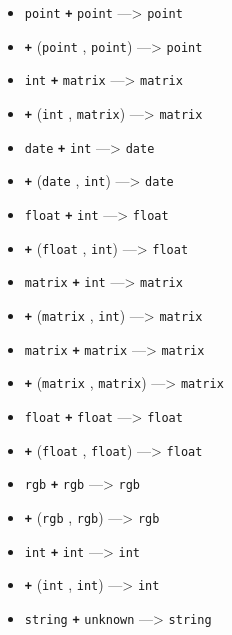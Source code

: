 \documentclass[]{book}
\providecommand{\tightlist}{%
  \setlength{\itemsep}{0pt}\setlength{\parskip}{0pt}}
\theoremstyle{definition}
\theoremstyle{definition}
\theoremstyle{definition}
\theoremstyle{remark}
\begin{document}
\begin{itemize}
\tightlist
\item
  \texttt{point} \textbf{\texttt{+}} \texttt{point} ---\textgreater{}
  \texttt{point}
\item
  \textbf{\texttt{+}} (\texttt{point} , \texttt{point})
  ---\textgreater{} \texttt{point}
\item
  \texttt{int} \textbf{\texttt{+}} \texttt{matrix} ---\textgreater{}
  \texttt{matrix}
\item
  \textbf{\texttt{+}} (\texttt{int} , \texttt{matrix}) ---\textgreater{}
  \texttt{matrix}
\item
  \texttt{date} \textbf{\texttt{+}} \texttt{int} ---\textgreater{}
  \texttt{date}
\item
  \textbf{\texttt{+}} (\texttt{date} , \texttt{int}) ---\textgreater{}
  \texttt{date}
\item
  \texttt{float} \textbf{\texttt{+}} \texttt{int} ---\textgreater{}
  \texttt{float}
\item
  \textbf{\texttt{+}} (\texttt{float} , \texttt{int}) ---\textgreater{}
  \texttt{float}
\item
  \texttt{matrix} \textbf{\texttt{+}} \texttt{int} ---\textgreater{}
  \texttt{matrix}
\item
  \textbf{\texttt{+}} (\texttt{matrix} , \texttt{int}) ---\textgreater{}
  \texttt{matrix}
\item
  \texttt{matrix} \textbf{\texttt{+}} \texttt{matrix} ---\textgreater{}
  \texttt{matrix}
\item
  \textbf{\texttt{+}} (\texttt{matrix} , \texttt{matrix})
  ---\textgreater{} \texttt{matrix}
\item
  \texttt{float} \textbf{\texttt{+}} \texttt{float} ---\textgreater{}
  \texttt{float}
\item
  \textbf{\texttt{+}} (\texttt{float} , \texttt{float})
  ---\textgreater{} \texttt{float}
\item
  \texttt{rgb} \textbf{\texttt{+}} \texttt{rgb} ---\textgreater{}
  \texttt{rgb}
\item
  \textbf{\texttt{+}} (\texttt{rgb} , \texttt{rgb}) ---\textgreater{}
  \texttt{rgb}
\item
  \texttt{int} \textbf{\texttt{+}} \texttt{int} ---\textgreater{}
  \texttt{int}
\item
  \textbf{\texttt{+}} (\texttt{int} , \texttt{int}) ---\textgreater{}
  \texttt{int}
\item
  \texttt{string} \textbf{\texttt{+}} \texttt{unknown} ---\textgreater{}
  \texttt{string}

\end{itemize}
\end{document}
